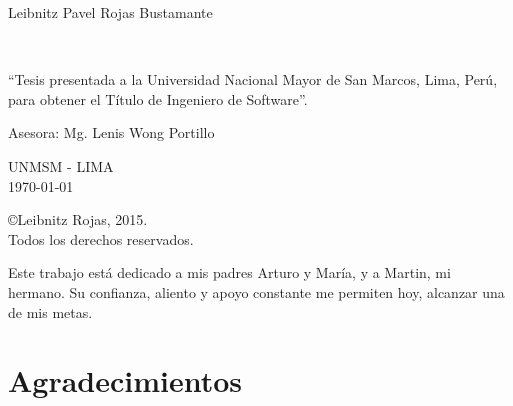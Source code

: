 \newpage
\begin{center}
    Leibnitz Pavel Rojas Bustamante
\end{center}
\vspace*{3cm}
\begin{Large}
\textbf{\miTesisTitulo} \\
\end{Large}
\vspace*{5cm}
\begin{flushright}
    \begin{minipage}{.5\textwidth}
    ``Tesis presentada a la Universidad Nacional Mayor de San Marcos, Lima, Perú, para obtener el Título de Ingeniero de Software''.
    \end{minipage}
    \end{flushright}
\vspace*{3cm}
\begin{flushright}
    \begin{minipage}{.5\textwidth}
    Asesora: Mg. Lenis Wong Portillo
    \end{minipage}
\end{flushright}
\vspace*{3cm}
\begin{center}
    UNMSM - LIMA\\
    \today
\end{center}

\newpage
\vspace*{\fill}
\begin{center}
\copyright \hspace{0.2cm}Leibnitz Rojas, 2015.\\
Todos los derechos reservados.
\end{center}

\newpage
\clearpage
\vspace*{\fill}
\begin{flushright}
\begin{minipage}{.5\textwidth}
Este trabajo está dedicado a mis padres Arturo y María, y a Martin, mi hermano. Su confianza, aliento y apoyo constante me permiten hoy, alcanzar una de mis metas.\\
\end{minipage}
\end{flushright}
\vfill %
\newpage
\chapter*{Agradecimientos}

